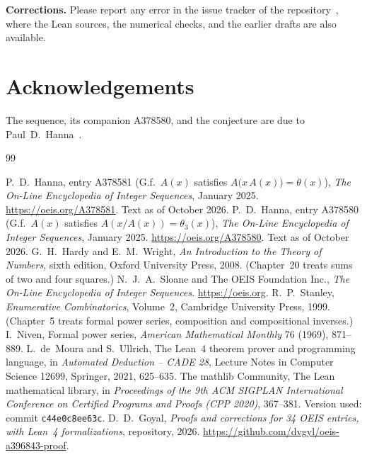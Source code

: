 \documentclass[11pt,a4paper]{article}
\theoremstyle{definition}
\theoremstyle{remark}
\newcommand{\para}[1]{\par\medskip\noindent\textbf{#1}\enspace}
\begin{document}
\para{Corrections.} Please report any error in the issue tracker of the repository~\cite{repo}, where the Lean
sources, the numerical checks, and the earlier drafts are also available.

\section*{Acknowledgements}
The sequence, its companion A378580, and the conjecture are due to Paul~D.~Hanna~\cite{oeis,oeisother}.

\begin{thebibliography}{99}\small
\raggedright
{} P.~D.~Hanna, entry A378581 (G.f.\ $A(x)$ satisfies $A\bigl(x\,A(x)\bigr)=\theta(x)$), \emph{The On-Line Encyclopedia of Integer Sequences}, January 2025. \url{https://oeis.org/A378581}. Text as of October 2026.
 P.~D.~Hanna, entry A378580 (G.f.\ $A(x)$ satisfies $A(x/A(x))=\theta_3(x)$), \emph{The On-Line Encyclopedia of Integer Sequences}, January 2025. \url{https://oeis.org/A378580}. Text as of October 2026.
 G.~H.~Hardy and E.~M.~Wright, \emph{An Introduction to the Theory of Numbers}, sixth edition, Oxford University Press, 2008. (Chapter~20 treats sums of two and four squares.)
 N.~J.~A.~Sloane and The OEIS Foundation Inc., \emph{The On-Line Encyclopedia of Integer Sequences}. \url{https://oeis.org}.
 R.~P.~Stanley, \emph{Enumerative Combinatorics}, Volume~2, Cambridge University Press, 1999. (Chapter~5 treats formal power series, composition and compositional inverses.)
 I.~Niven, Formal power series, \emph{American Mathematical Monthly} 76 (1969), 871--889.
 L.~de~Moura and S.~Ullrich, The Lean~4 theorem prover and programming language, in \emph{Automated Deduction -- CADE 28}, Lecture Notes in Computer Science 12699, Springer, 2021, 625--635.
 The mathlib Community, The Lean mathematical library, in \emph{Proceedings of the 9th ACM SIGPLAN International Conference on Certified Programs and Proofs (CPP 2020)}, 367--381. Version used: commit \texttt{c44e0c8ee63c}.
 D.~D.~Goyal, \emph{Proofs and corrections for 34 OEIS entries, with Lean~4 formalizations}, repository, 2026. \url{https://github.com/dvgyl/oeis-a396843-proof}.
\end{thebibliography}
\end{document}
